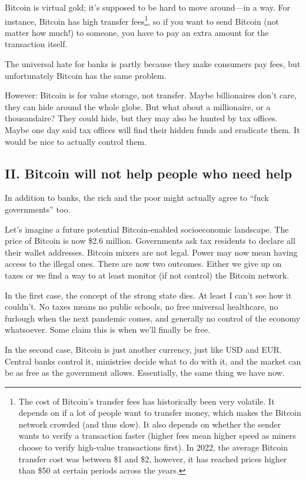 Bitcoin is virtual gold; it’s supposed to be hard to move around—in a way. For instance, Bitcoin has high transfer fees\footnote{The cost of Bitcoin’s transfer fees has historically been very volatile. It depends on if a lot of people want to transfer money, which makes the Bitcoin network crowded (and thus slow). It also depends on whether the sender wants to verify a transaction faster (higher fees mean higher speed as miners choose to verify high-value transactions first). In 2022, the average Bitcoin transfer cost was between \$1 and \$2, however, it has reached prices higher than \$50 at certain periods across the years.}, so if you want to send Bitcoin (not matter how much!) to someone, you have to pay an extra amount for the transaction itself.

The universal hate for banks is partly because they make consumers pay fees, but unfortunately Bitcoin has the same problem.

However: Bitcoin is for value storage, not transfer. Maybe billionaires don’t care, they can hide around the whole globe. But what about a millionaire, or a thousandaire? They could hide, but they may also be hunted by tax offices. Maybe one day said tax offices will find their hidden funds and eradicate them. It would be nice to actually control them.

\subsection{II. Bitcoin will not help people who need help}

In addition to banks, the rich and the poor might actually agree to “fuck governments” too.

Let’s imagine a future potential Bitcoin-enabled socioeconomic landscape. The price of Bitcoin is now \$2.6 million. Governments ask tax residents to declare all their wallet addresses. Bitcoin mixers are not legal. Power may now mean having access to the illegal ones. There are now two outcomes. Either we give up on taxes or we find a way to at least monitor (if not control) the Bitcoin network.

In the first case, the concept of the strong state dies. At least I can’t see how it couldn’t. No taxes means no public schools, no free universal healthcare, no furlough when the next pandemic comes, and generally no control of the economy whatsoever. Some claim this is when we’ll finally be free.

In the second case, Bitcoin is just another currency, just like USD and EUR. Central banks control it, ministries decide what to do with it, and the market can be as free as the government allows. Essentially, the same thing we have now.


